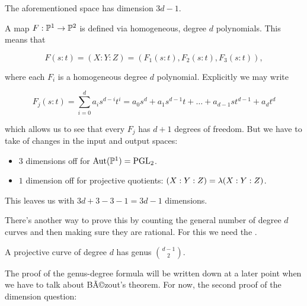 \documentclass[12pt]{memoir}
\begin{document}
\begin{Prop}\label{prop-dimension-maps-P1-to-P2}
    The aforementioned space has dimension \(3d-1\).
\end{Prop}

\begin{ptcbp}
    A map \(F:\mathbb{P}^1\to\mathbb{P}^2\) is defined via homogeneous, degree \(d\) polynomials. This means that

    \[F(s:t)=(X:Y:Z)=(F_1(s:t),F_2(s:t),F_3(s:t)),\]

    where each \(F_i\) is a homogeneous degree \(d\) polynomial. Explicitly we may write

    \[F_j(s:t)=\sum_{i=0}^da_is^{d-i}t^{i}=a_0s^d+a_1s^{d-1}t+\dots+a_{d-1}st^{d-1}+a_dt^d\]

    which allows us to see that every \(F_j\) has \(d+1\) degrees of freedom. But we have to take of changes in the input and output spaces:
    \begin{itemize}
        \item \(3\) dimensions off for \(\operatorname{Aut}(\mathbb{P}^1)=\operatorname{PGL}_2\).
        \item \(1\) dimension off for projective quotients: \((X:Y:Z)=\lambda(X:Y:Z)\).
    \end{itemize}
    This leaves us with \(3d+3-3-1=3d-1\) dimensions.
\end{ptcbp}

There's another way to prove this by counting the general number of degree \(d\) curves and then making sure they are rational. For this we need the .

\begin{Prop}\label{prop-genus-degree-formula}
    A projective curve of degree \(d\) has genus \(\binom{d-1}{2}\).
\end{Prop}

The proof of the genus-degree formula will be written down at a later point when we have to talk about BÃ©zout's theorem. For now, the second proof of the dimension question:
\end{document}
